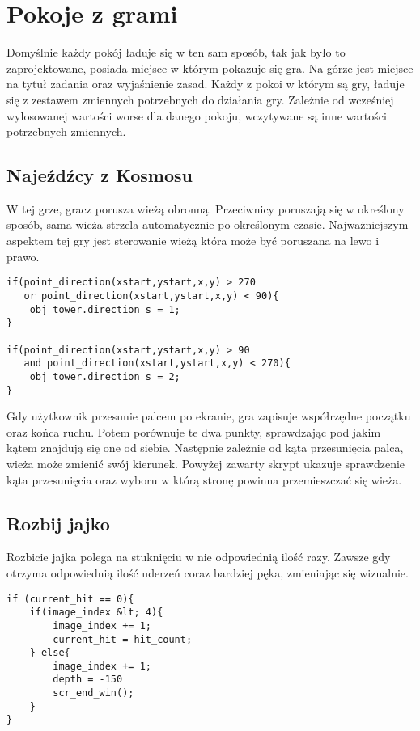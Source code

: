 \documentclass[openright]{xmgr}
\begin{document}
\section{Pokoje z grami}
Domyślnie każdy pokój ładuje się w ten sam sposób, tak jak było to zaprojektowane, posiada miejsce w którym pokazuje się gra. Na górze jest miejsce na tytuł zadania oraz wyjaśnienie zasad. Każdy z pokoi w którym są gry, ładuje się z zestawem zmiennych potrzebnych do działania gry. Zależnie od wcześniej wylosowanej wartości worse dla danego pokoju, wczytywane są inne wartości potrzebnych zmiennych.

\subsection{Najeźdźcy z Kosmosu}
W tej grze, gracz porusza wieżą obronną. Przeciwnicy poruszają się w określony sposób, sama wieża strzela automatycznie po określonym czasie. Najważniejszym aspektem tej gry jest sterowanie wieżą która może być poruszana na lewo i prawo.

\begin{lstlisting}[caption={Skrypt scr\_direction}]
if(point_direction(xstart,ystart,x,y) > 270 
   or point_direction(xstart,ystart,x,y) < 90){
    obj_tower.direction_s = 1;
}

if(point_direction(xstart,ystart,x,y) > 90 
   and point_direction(xstart,ystart,x,y) < 270){
    obj_tower.direction_s = 2;
}
\end{lstlisting}

Gdy użytkownik przesunie palcem po ekranie, gra zapisuje współrzędne początku oraz końca ruchu. Potem porównuje te dwa punkty, sprawdzając pod jakim kątem znajdują się one od siebie. Następnie zależnie od kąta przesunięcia palca, wieża może zmienić swój kierunek. Powyżej zawarty skrypt ukazuje sprawdzenie kąta przesunięcia oraz wyboru w którą stronę powinna przemieszczać się wieża.

\subsection{Rozbij jajko}
Rozbicie jajka polega na stuknięciu w nie odpowiednią ilość razy.  Zawsze gdy otrzyma odpowiednią ilość uderzeń coraz bardziej pęka, zmieniając się wizualnie.

\begin{lstlisting}[caption={Fragment  kodu obiektu obj\_egg}]
if (current_hit == 0){
    if(image_index &lt; 4){
        image_index += 1;
        current_hit = hit_count;
    } else{
        image_index += 1;
        depth = -150
        scr_end_win();
    }
}
\end{lstlisting}
\end{document}
